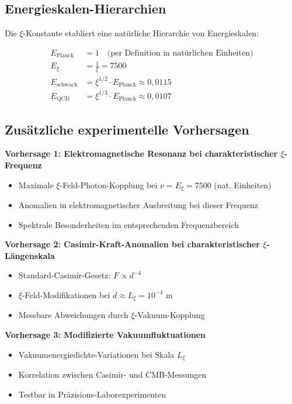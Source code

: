 	\subsection{Energieskalen-Hierarchien}
	
	Die $\xi$-Konstante etabliert eine natürliche Hierarchie von Energieskalen:
	
	\begin{align}
		E_{\text{Planck}} &= 1 \quad \text{(per Definition in natürlichen Einheiten)} \\
		E_\xi &= \frac{1}{\xi} = 7500 \\
		E_{\text{schwach}} &= \xi^{1/2} \cdot E_{\text{Planck}} \approx 0,0115 \\
		E_{\text{QCD}} &= \xi^{1/3} \cdot E_{\text{Planck}} \approx 0,0107
	\end{align}
	
	\subsection{Zusätzliche experimentelle Vorhersagen}
	
	\textbf{Vorhersage 1: Elektromagnetische Resonanz bei charakteristischer $\xi$-Frequenz}
	\begin{itemize}
		\item Maximale $\xi$-Feld-Photon-Kopplung bei $\nu = E_\xi = 7500$ (nat. Einheiten)
		\item Anomalien in elektromagnetischer Ausbreitung bei dieser Frequenz
		\item Spektrale Besonderheiten im entsprechenden Frequenzbereich
	\end{itemize}
	
	\textbf{Vorhersage 2: Casimir-Kraft-Anomalien bei charakteristischer $\xi$-Längenskala}
	\begin{itemize}
		\item Standard-Casimir-Gesetz: $F \propto d^{-4}$
		\item $\xi$-Feld-Modifikationen bei $d \approx L_\xi = 10^{-4}$ m
		\item Messbare Abweichungen durch $\xi$-Vakuum-Kopplung
	\end{itemize}
	
	\textbf{Vorhersage 3: Modifizierte Vakuumfluktuationen}
	\begin{itemize}
		\item Vakuumenergiedichte-Variationen bei Skala $L_\xi$
		\item Korrelation zwischen Casimir- und CMB-Messungen
		\item Testbar in Präzisions-Laborexperimenten
	\end{itemize}
	
